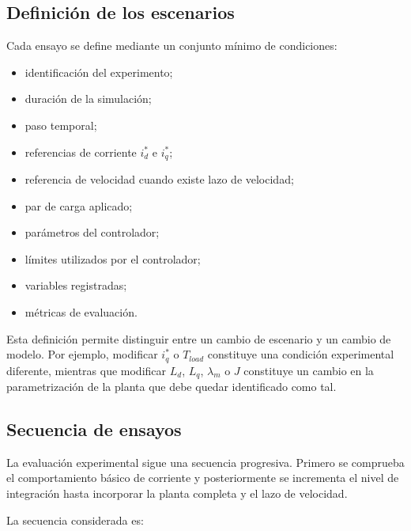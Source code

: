 \subsection{Definición de los escenarios}

Cada ensayo se define mediante un conjunto mínimo de condiciones:

\begin{itemize}
\item identificación del experimento;
\item duración de la simulación;
\item paso temporal;
\item referencias de corriente \(i_d^*\) e \(i_q^*\);
\item referencia de velocidad cuando existe lazo de velocidad;
\item par de carga aplicado;
\item parámetros del controlador;
\item límites utilizados por el controlador;
\item variables registradas;
\item métricas de evaluación.
\end{itemize}

Esta definición permite distinguir entre un cambio de escenario y un cambio de modelo. Por ejemplo, modificar \(i_q^*\) o \(T_{load}\) constituye una condición experimental diferente, mientras que modificar \(L_d\), \(L_q\), \(\lambda_m\) o \(J\) constituye un cambio en la parametrización de la planta que debe quedar identificado como tal.

\subsection{Secuencia de ensayos}

La evaluación experimental sigue una secuencia progresiva. Primero se comprueba el comportamiento básico de corriente y posteriormente se incrementa el nivel de integración hasta incorporar la planta completa y el lazo de velocidad.

La secuencia considerada es:

